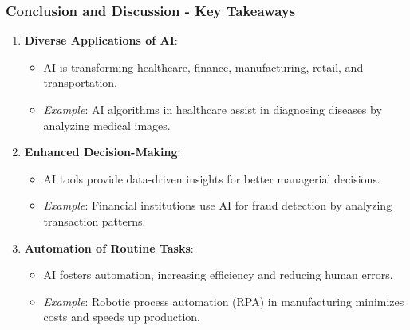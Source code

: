 \documentclass{beamer}
\begin{document}
\begin{frame}[fragile]
    \frametitle{Conclusion and Discussion - Key Takeaways}
    \begin{enumerate}
        \item \textbf{Diverse Applications of AI}: 
            \begin{itemize}
                \item AI is transforming healthcare, finance, manufacturing, retail, and transportation.
                \item \textit{Example}: AI algorithms in healthcare assist in diagnosing diseases by analyzing medical images.
            \end{itemize}
        
        \item \textbf{Enhanced Decision-Making}: 
            \begin{itemize}
                \item AI tools provide data-driven insights for better managerial decisions.
                \item \textit{Example}: Financial institutions use AI for fraud detection by analyzing transaction patterns.
            \end{itemize}
        
        \item \textbf{Automation of Routine Tasks}: 
            \begin{itemize}
                \item AI fosters automation, increasing efficiency and reducing human errors.
                \item \textit{Example}: Robotic process automation (RPA) in manufacturing minimizes costs and speeds up production.
            \end{itemize}
    \end{enumerate}
\end{frame}
\end{document}
